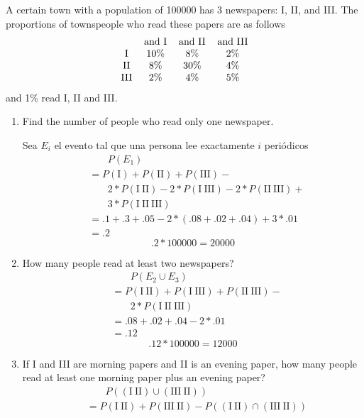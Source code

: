 \item A certain town with a population of 100000 has 3 newspapers: I, II, and III. The proportions of townspeople who read these papers are as follows
\[ 
\begin{tabular}{cccc}
     & and I & and II & and III \\
    I & 10\% & 8\% & 2\% \\
    II & 8\% & 30\% & 4\%\\
    III & 2\% & 4\% & 5\%
\end{tabular}
\]
and 1\% read I, II and III.
\begin{enumerate}
    \item Find the number of people who read only one newspaper.

    Sea $E_{i}$ el evento tal que una persona lee exactamente $i$ periódicos
    \begin{align*}
        &\phantom{\;=\;}P(E_1)\\
        &= P(\text{I}) + P(\text{II}) + P(\text{III}) - {}\\
        &\phantom{\;=\;} 2 * P(\text{I}\ \text{II}) - 2 * P(\text{I}\ \text{III}) - 2 * P(\text{II}\ \text{III}) +{}\\
        &\phantom{\;=\;} 3 * P(\text{I}\ \text{II}\ \text{III})\\
        &= .1 + .3 + .05 - 2 * (.08 + .02 + .04) + 3 * .01\\
        &= .2
    \end{align*}
    \[ .2 * 100000 = 20000 \]
    \item How many people read at least two newspapers?
    \begin{align*}
        &\phantom{\;=\;} P(E_2\cup E_3)\\
        &= P(\text{I}\ \text{II}) + P(\text{I}\ \text{III}) + P(\text{II}\ \text{III}) - {}\\
        &\phantom{\;=\;} 2 * P(\text{I}\ \text{II}\ \text{III})\\
        &= .08 + .02 + .04 - 2 * .01\\
        &= .12
    \end{align*}
    \[ .12 * 100000 = 12000 \]
    \item If I and III are morning papers and II is an evening paper, how many people read at least one morning paper plus an evening paper?
    \begin{align*}
        &\phantom{\;=\;} P((\text{I}\ \text{II})\cup(\text{III}\ \text{II}))\\
        &= P(\text{I}\ \text{II})+P(\text{III}\ \text{II})- P((\text{I}\ \text{II})\cap(\text{III}\ \text{II}))\\

\end{align*}
\end{enumerate}
